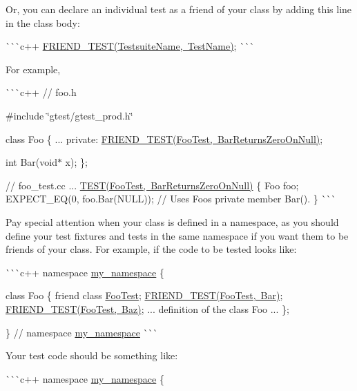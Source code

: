 \begin{DoxyItemize}
Or, you can declare an individual test as a friend of your class by adding this line in the class body\+:

\`{}\`{}\`{}c++ \mbox{\hyperlink{_obj__test_2lib_2googletest-release-1_88_81_2googletest_2include_2gtest_2gtest__prod_8h_a8d443b4cc1d87a7a17943b8fbdbf3910}{F\+R\+I\+E\+N\+D\+\_\+\+T\+E\+S\+T(\+Testsuite\+Name, Test\+Name)}}; \`{}\`{}\`{}

For example,

\`{}\`{}\`{}c++ // foo.\+h

\#include \char`\"{}gtest/gtest\+\_\+prod.\+h\char`\"{}

class Foo \{ ... private\+: \mbox{\hyperlink{_obj__test_2lib_2googletest-release-1_88_81_2googletest_2include_2gtest_2gtest__prod_8h_a8d443b4cc1d87a7a17943b8fbdbf3910}{F\+R\+I\+E\+N\+D\+\_\+\+T\+E\+S\+T(\+Foo\+Test, Bar\+Returns\+Zero\+On\+Null)}};

int Bar(void$\ast$ x); \};

// foo\+\_\+test.\+cc ... \mbox{\hyperlink{_obj__test_2lib_2googletest-release-1_88_81_2googletest_2include_2gtest_2gtest_8h_ad8b332753515c0ab8baada563c2547eb}{T\+E\+S\+T(\+Foo\+Test, Bar\+Returns\+Zero\+On\+Null)}} \{ Foo foo; E\+X\+P\+E\+C\+T\+\_\+\+EQ(0, foo.\+Bar(\+N\+U\+L\+L)); // Uses Foo\textquotesingle{}s private member Bar(). \} \`{}\`{}\`{}

Pay special attention when your class is defined in a namespace, as you should define your test fixtures and tests in the same namespace if you want them to be friends of your class. For example, if the code to be tested looks like\+:

\`{}\`{}\`{}c++ namespace \mbox{\hyperlink{namespacemy__namespace}{my\+\_\+namespace}} \{

class Foo \{ friend class \mbox{\hyperlink{class_foo_test}{Foo\+Test}}; \mbox{\hyperlink{_obj__test_2lib_2googletest-release-1_88_81_2googletest_2include_2gtest_2gtest__prod_8h_a8d443b4cc1d87a7a17943b8fbdbf3910}{F\+R\+I\+E\+N\+D\+\_\+\+T\+E\+S\+T(\+Foo\+Test, Bar)}}; \mbox{\hyperlink{_obj__test_2lib_2googletest-release-1_88_81_2googletest_2include_2gtest_2gtest__prod_8h_a8d443b4cc1d87a7a17943b8fbdbf3910}{F\+R\+I\+E\+N\+D\+\_\+\+T\+E\+S\+T(\+Foo\+Test, Baz)}}; ... definition of the class Foo ... \};

\} // namespace \mbox{\hyperlink{namespacemy__namespace}{my\+\_\+namespace}} \`{}\`{}\`{}

Your test code should be something like\+:

\`{}\`{}\`{}c++ namespace \mbox{\hyperlink{namespacemy__namespace}{my\+\_\+namespace}} \{


\end{DoxyItemize}
